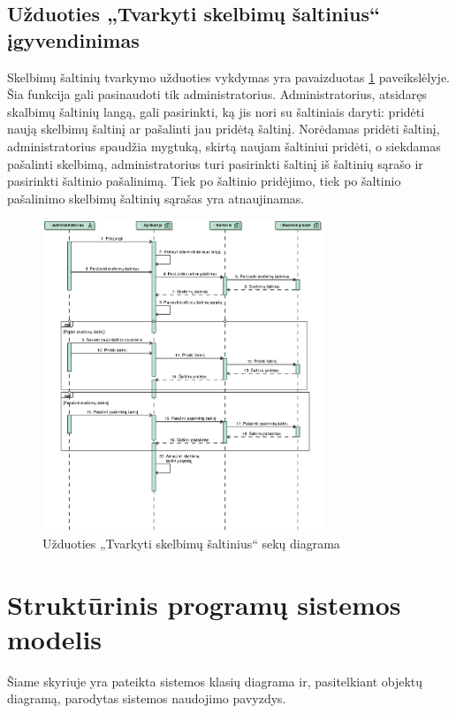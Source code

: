 \documentclass[12pt]{article}
\begin{document}
	\subsection{Užduoties „Tvarkyti skelbimų šaltinius“ įgyvendinimas}
	Skelbimų šaltinių tvarkymo užduoties vykdymas yra pavaizduotas \ref{ManSouSeq} paveikslėlyje. Šia funkcija gali pasinaudoti tik administratorius. Administratorius, atsidaręs skalbimų šaltinių langą, gali pasirinkti, ką jis nori su šaltiniais daryti: pridėti naują skelbimų šaltinį ar pašalinti jau pridėtą šaltinį. Norėdamas pridėti šaltinį, administratorius spaudžia mygtuką, skirtą naujam šaltiniui pridėti, o siekdamas pašalinti skelbimą, administratorius turi pasirinkti šaltinį iš šaltinių sąrašo ir pasirinkti šaltinio pašalinimą. Tiek po šaltinio pridėjimo, tiek po šaltinio pašalinimo skelbimų šaltinių sąrašas yra atnaujinamas.
	\begin{figure}[h]
		\begin{center}
			\includegraphics[width=0.75\textwidth]{TvarkytiSkelbimuSaltinius.eps}
			\caption{Užduoties „Tvarkyti skelbimų šaltinius“ sekų diagrama\label{ManSouSeq}}
		\end{center}
	\end{figure}

	\pagebreak
	
	\section{Struktūrinis programų sistemos modelis}
	Šiame skyriuje yra pateikta sistemos klasių diagrama ir, pasitelkiant objektų diagramą, parodytas sistemos naudojimo pavyzdys.
\end{document}
